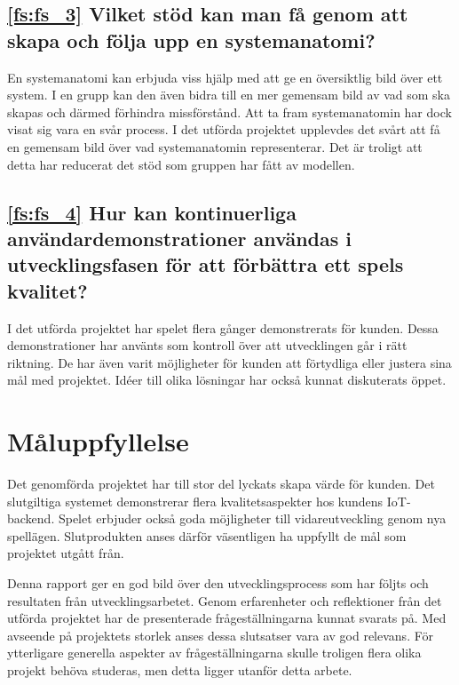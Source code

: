 \subsection*{\ref{fs:fs_3} Vilket stöd kan man få genom att skapa och följa upp en systemanatomi?}

En systemanatomi kan erbjuda viss hjälp med att ge en översiktlig bild över ett system. I en grupp kan den även bidra till en mer gemensam bild av vad som ska skapas och därmed förhindra missförstånd. Att ta fram systemanatomin har dock visat sig vara en svår process. I det utförda projektet upplevdes det svårt att få en gemensam bild över vad systemanatomin representerar. Det är troligt att detta har reducerat det stöd som gruppen har fått av modellen.

\subsection*{\ref{fs:fs_4} Hur kan kontinuerliga användardemonstrationer användas i utvecklingsfasen för att förbättra ett spels kvalitet?}

I det utförda projektet har spelet flera gånger demonstrerats för kunden. Dessa demonstrationer har använts som kontroll över att utvecklingen går i rätt riktning. De har även varit möjligheter för kunden att förtydliga eller justera sina mål med projektet. Idéer till olika lösningar har också kunnat diskuterats öppet.

\section{Måluppfyllelse}

Det genomförda projektet har till stor del lyckats skapa värde för kunden. Det slutgiltiga systemet demonstrerar flera kvalitetsaspekter hos kundens IoT-backend. Spelet erbjuder också goda möjligheter till vidareutveckling genom nya spellägen. Slutprodukten anses därför väsentligen ha uppfyllt de mål som projektet utgått från.

Denna rapport ger en god bild över den utvecklingsprocess som har följts och resultaten från utvecklingsarbetet. Genom erfarenheter och reflektioner från det utförda projektet har de presenterade frågeställningarna kunnat svarats på. Med avseende på projektets storlek anses dessa slutsatser vara av god relevans. För ytterligare generella aspekter av frågeställningarna skulle troligen flera olika projekt behöva studeras, men detta ligger utanför detta arbete.

